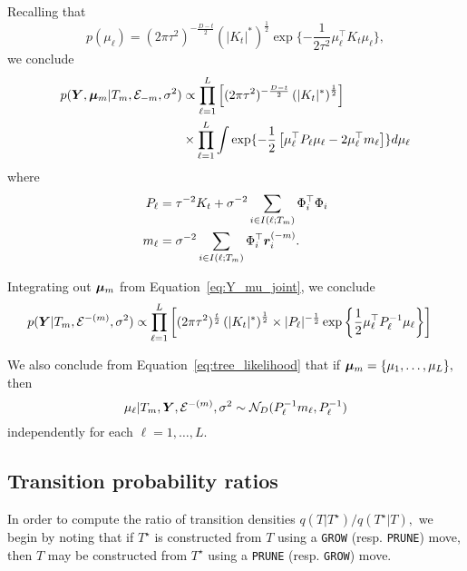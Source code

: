 Recalling that
$$
p(\mu_{\ell}) = (2\pi\tau^{2})^{-\frac{D - t}{2}}\left(\lvert K_{t}\rvert^{*}\right)^{\frac{1}{2}}\exp\{-\frac{1}{2\tau^{2}}\mu_{\ell}^{\top}K_{t}\mu_{\ell}\},
$$
we conclude
\begin{align}
\begin{split}
\label{eq:Y_mu_joint}
p(\bm{Y}, \boldsymbol{\mu}_{m} \vert T_{m}, \mathcal{E}_{-m}, \sigma^{2}) &\propto \prod_{\ell = 1}^{L}{\left[(2\pi\tau^{2})^{-\frac{D - t}{2}}\left(\lvert K_{t} \rvert^{*}\right)^{\frac{1}{2}}\right]} \\
~ &\times \prod_{\ell = 1}^{L}{\int{\exp\{-\frac{1}{2}\left[\mu_{\ell}^{\top}P_{\ell}\mu_{\ell} - 2\mu_{\ell}^{\top}m_{\ell}\right]\}d\mu_{\ell}}}
\end{split}
\end{align}
where
\begin{align}
P_{\ell} &= \tau^{-2}K_{t} + \sigma^{-2}\sum_{i \in I(\ell;T_{m})}{\Phi_{i}^{\top}\Phi_{i}} \\
m_{\ell} &= \sigma^{-2}\sum_{i \in I(\ell;T_{m})}{\Phi_{i}^{\top}\bm{r}_{i}^{(-m)}}.
\end{align}

Integrating out $\boldsymbol{\mu}_{m}$ from Equation~\eqref{eq:Y_mu_joint}, we conclude
\begin{align}
\label{eq:tree_likelihood}
p(\bm{Y} \vert T_{m}, \mathcal{E}^{-(m)}, \sigma^{2}) &\propto \prod_{\ell = 1}^{L}{\left[(2\pi\tau^{2})^{\frac{t}{2}}\left(\lvert K_{t} \rvert^{*}\right)^{\frac{1}{2}} \times \lvert P_{\ell} \rvert^{-\frac{1}{2}}\exp\left\{\frac{1}{2}\mu_{\ell}^{\top}P_{\ell}^{-1}\mu_{\ell}\right\}\right]} 
\end{align}

We also conclude from Equation~\eqref{eq:tree_likelihood} that if $\boldsymbol{\mu}_{m} = \{\mu_{1}, \ldots, \mu_{L}\},$ then
\begin{equation}
\label{eq:mu_posterior}
\mu_{\ell} \vert T_{m}, \bm{Y}, \mathcal{E}^{-(m)}, \sigma^{2} \sim \mathcal{N}_{D}(P_{\ell}^{-1}m_{\ell}, P_{\ell}^{-1})
\end{equation}
independently for each $\ell = 1, \ldots, L.$


\subsection{Transition probability ratios}

In order to compute the ratio of transition densities $q(T \vert T^{\star})/q(T^{\star} \vert T),$ we begin by noting that if $T^{\star}$ is constructed from $T$ using a \texttt{GROW} (resp. \texttt{PRUNE}) move, then $T$ may be constructed from $T^{\star}$ using a \texttt{PRUNE} (resp. \texttt{GROW}) move. 




